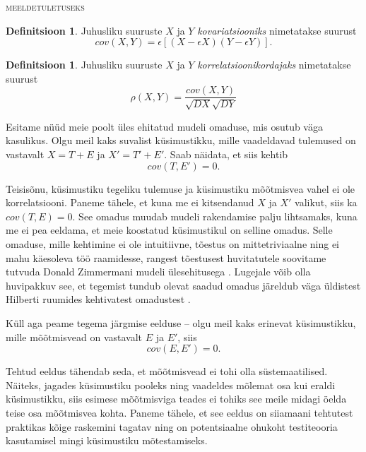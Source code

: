 \documentclass[a4paper,12pt,oneside]{article}
\newenvironment{meeldetuletus}{
	\begin{lrbox}{\thisOne}
		\begin{minipage}{0.95\textwidth} \vspace{0.25em} {\scriptsize \textsc{meeldetuletuseks}} \linebreak \vspace{-0.5em}
} 
{  
 \end{minipage}\end{lrbox}{
 		
 			\begin{mdframed}[tikzsetting={draw=black,dashed,line width=0.5pt, dash pattern = on 10pt off 3pt},%
 			linecolor=background_example,backgroundcolor=background_example,outerlinewidth=1pt]
			
 			\usebox{\thisOne}
 			\end{mdframed}
 		
 		
 	}
}
\numberwithin{equation}{section}
\theoremstyle{definition}
\newtheorem*{kovariatsioon}{Definitsioon}
\newtheorem*{korrelatsioon}{Definitsioon}
\begin{document}
\begin{meeldetuletus}
\begin{kovariatsioon}
Juhusliku suuruste $X$ ja $Y$ \textit{kovariatsiooniks} nimetatakse suurust
\begin{equation*}
cov(X,Y) = \epsilon \left[  \left( X - \epsilon X \right)\left(Y - \epsilon Y \right) \right]  \text{.}
\end{equation*}
\end{kovariatsioon}
\begin{korrelatsioon}
Juhusliku suuruste $X$ ja $Y$ \textit{korrelatsioonikordajaks} nimetatakse suurust 
\begin{equation*}
\rho (X,Y) = \frac{cov(X,Y)}{\sqrt{DX}\sqrt{DY}} 
\end{equation*}
\end{korrelatsioon}
\end{meeldetuletus}

Esitame nüüd meie poolt üles ehitatud mudeli omaduse, mis osutub väga kasulikus. Olgu meil kaks suvalist küsimustikku, mille vaadeldavad tulemused on vastavalt $X = T + E$ ja $X' = T' + E'$. Saab näidata, et  siis kehtib 
\begin{equation}
\label{eq:cov_zero}
cov(T,E') = 0 \text{.}
\end{equation} 

{\color{green}
Teisisõnu, küsimustiku tegeliku tulemuse ja küsimustiku mõõtmisvea vahel ei ole korrelatsiooni. Paneme tähele, et kuna me ei kitsendanud $X$ ja $X'$ valikut, siis ka $cov(T,E) = 0$. See omadus muudab mudeli rakendamise palju lihtsamaks, kuna me ei pea eeldama, et meie koostatud küsimustikul on selline omadus. Selle omaduse, mille kehtimine ei ole intuitiivne, tõestus on mittetriviaalne ning ei mahu käesoleva töö raamidesse, rangest tõestusest huvitatutele soovitame tutvuda Donald Zimmermani mudeli ülesehitusega \cite{Zimmerman1976}. Lugejale võib olla huvipakkuv see, et tegemist tundub olevat saadud omadus järeldub väga üldistest Hilberti ruumides kehtivatest omadustest \cite{Zimmerman1975}.
}

Küll aga peame tegema järgmise eelduse -- olgu meil kaks erinevat küsimustikku, mille mõõtmisvead on vastavalt $E$ ja $E'$, siis 
\begin{equation}
\label{eq:error_cov_0}
cov(E,E') = 0 \text{.}
\end{equation}

Tehtud eeldus tähendab seda, et mõõtmisvead ei tohi olla süstemaatilised. Näiteks, jagades küsimustiku pooleks ning vaadeldes mõlemat osa kui eraldi küsimustikku, siis  esimese mõõtmisviga teades ei tohiks see meile midagi öelda teise osa mõõtmis\-vea kohta. Paneme tähele, et see eeldus on siiamaani tehtutest praktikas kõige raskemini tagatav ning on potentsiaalne ohukoht testiteooria kasutamisel mingi küsimus\-tiku mõtestamiseks.
\end{document}
